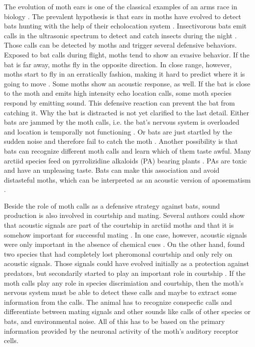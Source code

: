 \documentclass[12pt,a4paper]{article}
\begin{document}
The evolution of moth ears is one of the classical examples of an arms race in biology \cite{hofstede2016}. The prevalent hypothesis is that ears in moths have evolved to detect bats hunting with the help of their echolocation system \cite{roeder1961detection, miller2001, ratcliffe2009, conner2012}. Insectivorous bats emit calls in the ultrasonic spectrum to detect and catch insects during the night \cite{schnitzler2001}. Those calls can be detected by moths and trigger several defensive behaviors. Exposed to bat calls during flight, moths tend to show an evasive behavior. If the bat is far away, moths fly in the opposite direction. In close range, however, moths start to fly in an erratically fashion, making it hard to predict where it is going to move \cite{roeder1961detection, acharya1999}. Some moths show an acoustic response, as well. If the bat is close to the moth and emits high intensity echo location calls, some moth species respond by emitting sound. This defensive reaction can prevent the bat from catching it. Why the bat is distracted is not yet clarified to the last detail. Either bats are jammed by the moth calls, i.e. the bat's nervous system is overloaded and location is temporally not functioning \cite{corcoran2010, corcoran2011, conner2012}. Or bats are just startled by the sudden noise and therefore fail to catch the moth \cite{fullard1977}. Another possibility is that bats can recognize different moth calls and learn which of them taste awful. Many arctiid species feed on pyrrolizidine alkaloids (PA) bearing plants \cite{boppre2011, ratcliffe2005}. PAs are toxic and have an unpleasing taste. Bats can make this association and avoid distasteful moths, which can be interpreted as an acoustic version of aposematism \cite{eckrich1990chemical, hristov2005, miller2001}. 

Beside the role of moth calls as a defensive strategy against bats, sound production is also involved in courtship and mating. Several authors could show that acoustic signals are part of the courtship in arctiid moths and that it is somehow important for successful mating \cite{sanderford1990, simmons1996, sanderford1998}. In one case, however, acoustic signals were only important in the absence of chemical cues \cite{conner1987}. On the other hand, \cite{weller1999} found two species that had completely lost pheromonal courtship and only rely on acoustic signals. Those signals could have evolved initially as a protection against predators, but secondarily started to play an important role in courtship \cite{simmons1996, phelan1997evolution, weller1999}. If the moth calls play any role in species discrimiation and courtship, then the moth's nervous system must be able to detect these calls and maybe to extract some information from the calls. The animal has to recognize conspecfic calls and differentiate between mating signals and other sounds like calls of other species or bats, and environmental noise. All of this has to be based on the primary information provided by the neuronal activity of the moth's auditory receptor cells.
\end{document}
